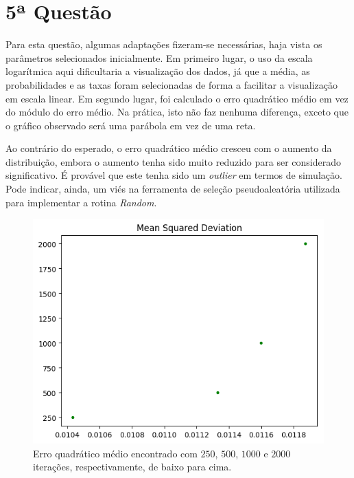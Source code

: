 \documentclass{article}
\begin{document}

\section*{5ª Questão}

Para esta questão, algumas adaptações fizeram-se necessárias, haja vista os parâmetros selecionados inicialmente.
Em primeiro lugar, o uso da escala logarítmica aqui dificultaria a visualização dos dados, já que a média, as probabilidades e as taxas foram selecionadas de forma a facilitar a visualização em escala linear.
Em segundo lugar, foi calculado o erro quadrático médio em vez do módulo do erro médio.
Na prática, isto não faz nenhuma diferença, exceto que o gráfico observado será uma parábola em vez de uma reta.

Ao contrário do esperado, o erro quadrático médio cresceu com o aumento da distribuição, embora o aumento tenha sido muito reduzido para ser considerado significativo. 
É provável que este tenha sido um \emph{outlier} em termos de simulação. 
Pode indicar, ainda, um viés na ferramenta de seleção pseudoaleatória utilizada para implementar a rotina \emph{Random}.


\begin{figure}[H]
	\includegraphics[width=\linewidth]{fig7_250.png}
	\centering
	
	\caption{Erro quadrático médio encontrado com $250$, $500$, $1000$ e $2000$ iterações, respectivamente, de baixo para cima.}
	\label{}
\end{figure}

\end{document}
